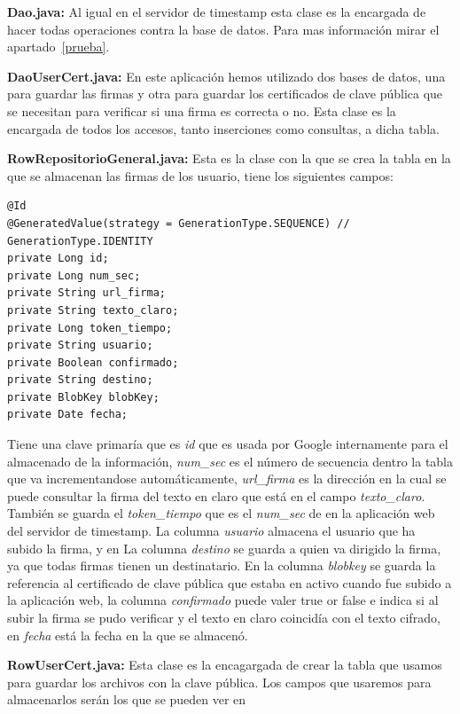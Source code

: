 \begin{description}
\item \textbf{Dao.java:} Al igual en el servidor de timestamp esta clase es la encargada de hacer todas operaciones contra la base de datos. Para mas información mirar el apartado~\ref{prueba}.

\item \textbf{DaoUserCert.java:} En este aplicación hemos utilizado dos bases de datos, una para guardar las firmas y otra para guardar los certificados de clave pública que se necesitan para verificar si una firma es correcta o no. Esta clase es la encargada de todos los accesos, tanto inserciones como consultas, a dicha tabla. 

\item \textbf{RowRepositorioGeneral.java:} Esta es la clase con la que se crea la tabla en la que se almacenan las firmas de los usuario, tiene los siguientes campos:  

\begin{lstlisting}[style=Java]
@Id
@GeneratedValue(strategy = GenerationType.SEQUENCE) //	 GenerationType.IDENTITY
private Long id;
private Long num_sec;
private String url_firma;
private String texto_claro;
private Long token_tiempo;
private String usuario;
private Boolean confirmado;
private String destino;
private BlobKey blobKey;
private Date fecha;
\end{lstlisting}

Tiene una clave primaría que es \textit{id} que es usada por Google internamente para el almacenado de la información, \textit{num\_sec} es el número de secuencia dentro la tabla que va incrementandose automáticamente, \textit{url\_firma} es la dirección en la cual se puede consultar la firma del texto en claro que está en el campo \textit{texto\_claro}. También se guarda el \textit{token\_tiempo} que es el \textit{num\_sec} de en la aplicación web del servidor de timestamp. La columna \textit{usuario} almacena el usuario que ha subido la firma, y en La columna \textit{destino} se guarda a quien va dirigido la firma, ya que todas firmas tienen un destinatario. En la columna \textit{blobkey} se guarda la referencia al certificado de clave pública que estaba en activo cuando fue subido a la aplicación web, la columna \textit{confirmado} puede valer true or false e indica si al subir la firma se pudo verificar y el texto en claro coincidía con el texto cifrado, en \textit{fecha} está la fecha en la que se almacenó.

\item \textbf{RowUserCert.java:} Esta clase es la encagargada de crear la tabla que usamos para guardar los archivos con la clave pública.
Los campos que usaremos para almacenarlos serán los que se pueden ver en 


\end{description}
